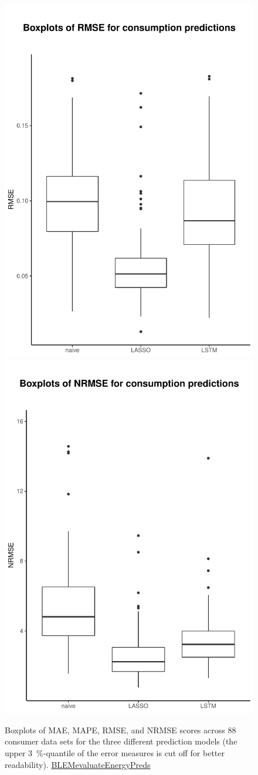 \begin{figure}
    \includegraphics[width=.5\textwidth-5pt]{thesis/graphs/evaluation/c_boxplot_RMSE.pdf}
    \includegraphics[width=.5\textwidth-5pt]{thesis/graphs/evaluation/c_boxplot_NRMSE.pdf} \\
    \caption[Boxplots of error measures for prediction of consumption values]{Boxplots of MAE, MAPE, RMSE, and NRMSE scores across 88 consumer data sets for the three different prediction models (the upper 3~\%-quantile of the error measures is cut off for better readability). \quantnet\href{https://github.com/QuantLet/BLEM/tree/master/BLEMevaluateEnergyPreds}{BLEMevaluateEnergyPreds}}
    \label{Fig:boxplots_errormeasures}
\end{figure}
%

